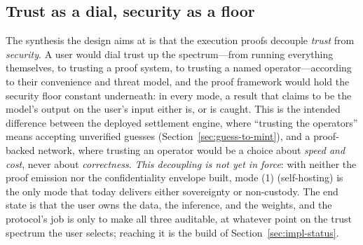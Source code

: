 \subsection{Trust as a dial, security as a floor}

The synthesis the design aims at is that the execution proofs decouple \emph{trust} from
\emph{security}.
A user would dial trust up the spectrum---from running everything themselves, to trusting
a proof system, to trusting a named operator---according to their convenience and
threat model, and the proof framework would hold the security floor constant underneath:
in every mode, a result that claims to be the model's output on the user's input
either is, or is caught. This is the intended difference between the deployed settlement
engine, where ``trusting the operators'' means accepting unverified guesses
(Section~\ref{sec:guess-to-mint}), and a proof-backed network, where trusting an
operator would be a choice about \emph{speed and cost}, never about \emph{correctness}.
\emph{This decoupling is not yet in force}: with neither the proof emission nor the
confidentiality envelope built, mode (1) (self-hosting) is the only mode that today
delivers either sovereignty or non-custody. The end state is that the
user owns the data, the inference, and the weights, and the protocol's job is
only to make all three auditable, at whatever point on the trust spectrum the user
selects; reaching it is the build of Section~\ref{sec:impl-status}.
